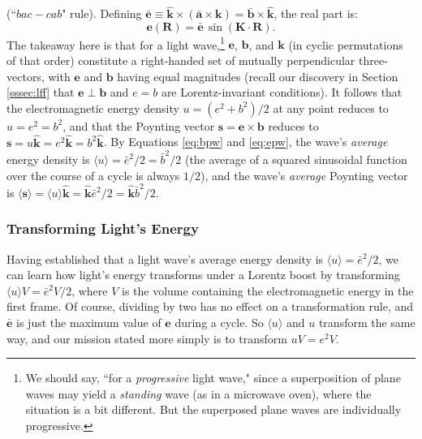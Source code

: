 \documentclass[12pt]{article}
\renewcommand{\vv}[1]{\mathbf{#1}}
\begin{document}
(``$bac - cab$" rule). Defining $\bar{\vv e} \equiv \vv{\hat{k}} \times (\bar{\vv a} \times \vv k) = \bar{\vv b} \times \vv{\hat{k}}$, the real part is:
\begin{equation}\label{eq:epw}
\vv e (\vv R) = \bar{\vv e} \, \sin \left( \vv K \cdot \vv R \right) .
\end{equation}
The takeaway here is that for a light wave,\footnote{We should say, ``for a \emph{progressive} light wave," since a superposition of plane waves may yield a \emph{standing} wave (as in a microwave oven), where the situation is a bit different. But the superposed plane waves are individually progressive.} $\vv e$, $\vv b$, and $\vv k$ (in cyclic permutations of that order) constitute a right-handed set of mutually perpendicular three-vectors, with $\vv e$ and $\vv b$ having equal magnitudes (recall our discovery in Section \ref{sssec:lff} that $\vv e \perp \vv b$ and $e = b$ are Lorentz-invariant conditions). It follows that the electromagnetic energy density $u = (e^2 + b^2) / 2$ at any point reduces to $u = e^2 = b^2$, and that the Poynting vector $\vv s = \vv e \times \vv b$ reduces to $\vv s = u \vv{\hat{k}} = e^2 \vv{\hat{k}} = b^2 \vv{\hat{k}}$. By Equations \ref{eq:bpw} and \ref{eq:epw}, the wave's \emph{average} energy density is $\langle u \rangle = \bar{e}^2 / 2 = \bar{b}^2 / 2$ (the average of a squared sinusoidal function over the course of a cycle is always $1/2$), and the wave's \emph{average} Poynting vector is $\langle \vv s \rangle = \langle u \rangle \vv{\hat{k}} = \vv{\hat{k}} \bar{e}^2 / 2 = \vv{\hat{k}} \bar{b}^2 / 2$.


\subsubsection{Transforming Light's Energy}

Having established that a light wave's average energy density is $\langle u \rangle = \bar{e}^2 / 2$, we can learn how light's energy transforms under a Lorentz boost by transforming $\langle u \rangle V = \bar{e}^2 V / 2$, where $V$ is the volume containing the electromagnetic energy in the first frame. Of course, dividing by two has no effect on a transformation rule, and $\bar{\vv e}$ is just the maximum value of $\vv e$ during a cycle. So $\langle u \rangle$ and $u$ transform the same way, and our mission stated more simply is to transform $uV = e^2 V$.
\end{document}
